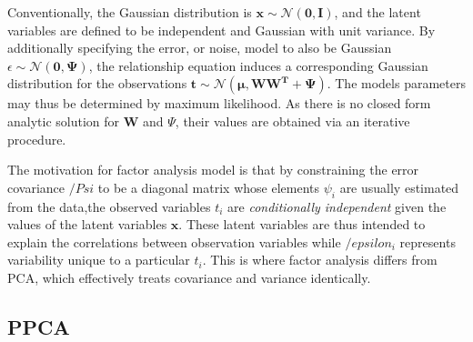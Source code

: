 \documentclass[ %
                    author={Dillon Keith Diep},
                supervisor={Dr. Carl Henrik Ek},
                    degree={MEng},
                     title={Assisted Content Generation for 3D Hair Geometry},
                  subtitle={[INCOMPLETE DRAFT, CONTAINS NOTES FROM RESEARCH]},
                      type={Research},
                      year={2014} ]{dissertation}
\begin{document}
Conventionally, the Gaussian distribution is $\mathbf{x}\sim\mathcal{N}(\mathbf{0,I})$, and the latent variables are defined to be independent and Gaussian with unit variance. By additionally specifying the error, or noise, model to also be Gaussian $\epsilon \sim\mathcal{N}(\mathbf{0, \Psi})$, the relationship equation induces a corresponding Gaussian distribution for the observations
$\mathbf{t\sim\mathcal{N}(\mu, \mathbf{WW}^T+\Psi)}$. The models parameters may thus be determined by maximum likelihood. As there is no closed form analytic solution for $\mathbf{W}$ and $\Psi$, their values are obtained via an iterative procedure.

The motivation for factor analysis model is that by constraining the error covariance $/Psi$ to be a diagonal matrix whose elements $\psi_i$ are usually estimated from the data,the observed variables $t_i$ are \textit{conditionally independent} given the values of the latent variables $\mathbf{x}$. These latent variables are thus intended to explain the correlations between observation variables while $/epsilon_i$ represents variability unique to a particular $t_i$. This is where factor analysis differs from PCA, which effectively treats covariance and variance identically.

\subsection{PPCA}
\end{document}
